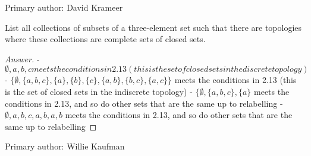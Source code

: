 Primary author: David Krameer

\begin{minorEx}
    List all collections of subsets of a three-element set such that there are
    topologies where these collections are complete sets of closed sets.
\end{minorEx}
\begin{proof}[Answer]
- ${\emptyset, {a, b, c}} meets the conditions in 2.13 (this is the set of closed sets in the discrete topology)$
- $\{\emptyset, \{a, b, c\}, \{a\}, \{b\}, \{c\}, \{a, b\}, \{b, c\}, \{a, c\}\}$ meets the conditions in 2.13 (this is the set of closed sets in the indiscrete topology)
- $\{\emptyset, \{a, b, c\}, \{a\}$ meets the conditions in 2.13, and so do other sets that are the same up to relabelling
- ${\emptyset, {a, b, c}, {a}, {b}, {a, b}}$ meets the conditions in 2.13, and so do other sets that are the same up to relabelling
\end{proof}

Primary author: Willie Kaufman
